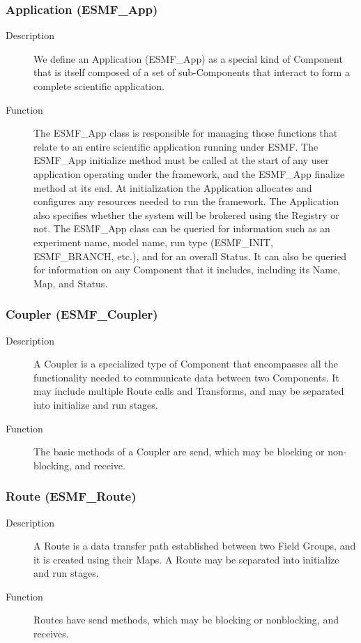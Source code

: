 \subsubsection{Application (ESMF\_App)}
\begin{description} 
\item [Description] We define an Application (ESMF\_App) as a special kind of Component 
that is itself composed of a set of sub-Components that interact to form a complete scientific
application.  
\item [Function] The ESMF\_App class is responsible for managing those functions that relate 
to an entire scientific application running under ESMF.  The ESMF\_App initialize method 
must be called at the start of any user application operating under the framework, and
the ESMF\_App finalize method at its end.  At initialization the Application allocates and 
configures any resources needed to run the framework.  The Application also specifies whether 
the system will be brokered using the Registry or not.  The ESMF\_App class can be queried 
for information such as an experiment name, model name, run type (ESMF\_INIT, 
ESMF\_BRANCH, etc.), and for an overall Status.  It can also be queried for
information on any Component that it includes, including its Name, Map, and
Status.
\end{description}

\subsubsection{Coupler (ESMF\_Coupler)}
\begin{description}
\item [Description] A Coupler is a specialized type of Component that encompasses all the 
functionality needed to communicate
data between two Components. It may include multiple Route calls and Transforms, and
may be separated into initialize and run stages.
\item [Function] The basic methods of a Coupler are send, which may be blocking or
non-blocking, and receive. 
\end{description}

\subsubsection{Route (ESMF\_Route)}
\label{sec:route}
\begin{description}
\item [Description] A Route is a data transfer path established between two Field Groups,
and it is created using their Maps.  A Route may be separated into initialize and run stages.
\item [Function] Routes have send methods, which may be blocking or nonblocking, and receives.
\end{description}

